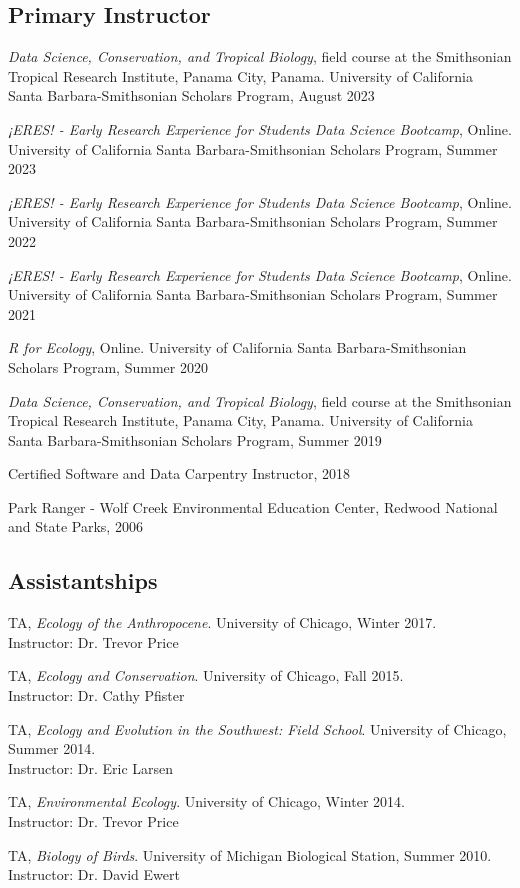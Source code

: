 \documentclass[letterpaper]{article}
\newenvironment{biblist}{%
   \begin{list}{}{%
     \setlength{\labelwidth}{0pt}%
     \setlength{\labelsep}{1em}%
     \setlength{\leftmargin}{2em}%
     \setlength{\itemindent}{-1em}%
   }
}{\end{list}}
\begin{document}
\subsection*{Primary Instructor}
\begin{biblist}
\item \emph{Data Science, Conservation, and Tropical Biology}, field course at the Smithsonian Tropical Research Institute, Panama City, Panama. University of California Santa Barbara-Smithsonian Scholars Program, August 2023 
\item \emph{¡ERES! - Early Research Experience for Students Data Science Bootcamp}, Online. University of California Santa Barbara-Smithsonian Scholars Program, Summer 2023
\item \emph{¡ERES! - Early Research Experience for Students Data Science Bootcamp}, Online. University of California Santa Barbara-Smithsonian Scholars Program, Summer 2022
\item \emph{¡ERES! - Early Research Experience for Students Data Science Bootcamp}, Online. University of California Santa Barbara-Smithsonian Scholars Program, Summer 2021
\item \emph{R for Ecology}, Online. University of California Santa Barbara-Smithsonian Scholars Program, Summer 2020
\item \emph{Data Science, Conservation, and Tropical Biology}, field course at the Smithsonian Tropical Research Institute, Panama City, Panama. University of California Santa Barbara-Smithsonian Scholars Program, Summer 2019 
\item Certified Software and Data Carpentry Instructor, 2018
\item Park Ranger - Wolf Creek Environmental Education Center, Redwood National and State Parks, 2006
\end{biblist}

\subsection*{Assistantships}
\begin{biblist}
\item TA, \textit{Ecology of the Anthropocene}. University of Chicago, Winter 2017. 
\\Instructor: Dr. Trevor Price
\item TA, \textit{Ecology and Conservation}. University of Chicago, Fall 2015. 
\\Instructor: Dr. Cathy Pfister
\item TA, \textit{Ecology and Evolution in the Southwest: Field School}. University of Chicago, Summer 2014.
\\Instructor: Dr. Eric Larsen
\item TA, \textit{Environmental Ecology}. University of Chicago, Winter 2014. 
\\Instructor: Dr. Trevor Price
\item TA, \textit{Biology of Birds}. University of Michigan Biological Station, Summer 2010. 
\\Instructor: Dr. David Ewert
\end{biblist}
\end{document}
